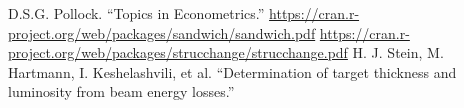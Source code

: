\documentclass{report}
\begin{document}
\begin{thebibliography}{9}
	D.S.G. Pollock. ``Topics in Econometrics.''
	\url{https://cran.r-project.org/web/packages/sandwich/sandwich.pdf}
	\url{https://cran.r-project.org/web/packages/strucchange/strucchange.pdf}
	H. J. Stein, M. Hartmann, I. Keshelashvili, et al. ``Determination of target thickness and luminosity from beam energy losses.''
\end{thebibliography}
\end{document}
